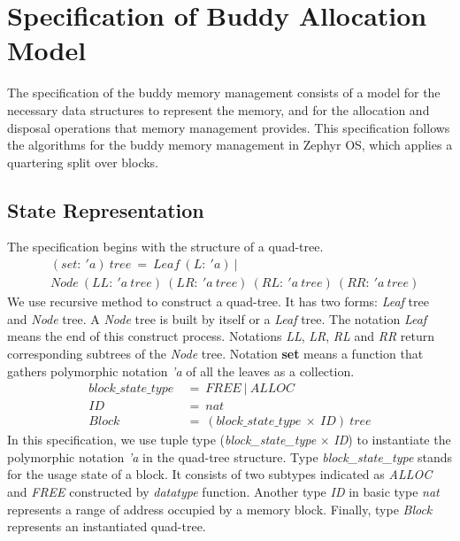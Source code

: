 \section{Specification of Buddy Allocation Model}
The specification of the buddy memory management consists of a model for the necessary data structures to represent the memory, and for the allocation and disposal operations that memory management provides. This specification follows the algorithms for the buddy memory management in Zephyr OS, which applies a quartering split over blocks.

\subsection{State Representation}
\label{statedes}
The specification begins with the structure of a quad-tree.
{\footnotesize
\begin{align*}
&(set:\ 'a)\ tree\ =\ Leaf\ (L:\ 'a)\ | \\
&Node\ (LL:\ 'a\ tree)\ (LR:\ 'a\ tree)\ (RL:\ 'a\ tree)\ (RR:\ 'a\ tree)
\end{align*}
}
We use recursive method to construct a quad-tree. It has two forms: \emph{Leaf} tree and \emph{Node} tree. A \emph{Node} tree is built by itself or a \emph{Leaf} tree. The notation \emph{Leaf} means the end of this construct process. Notations \emph{LL}, \emph{LR}, \emph{RL} and \emph{RR} return corresponding subtrees of the \emph{Node} tree. Notation \textbf{set} means a function that gathers polymorphic notation \emph{'a} of all the leaves as a collection.
{\footnotesize
\begin{align*}
block\_state\_type\ &=\ FREE\ |\ ALLOC \\
ID\ &=\ nat \\
Block\ &=\ (block\_state\_type\ \times\ ID)\ tree
\end{align*}
}
In this specification, we use tuple type (\emph{block\_state\_type} $\times$ \emph{ID}) to instantiate the polymorphic notation \emph{'a} in the quad-tree structure. Type \emph{block\_state\_type} stands for the usage state of a block. It consists of two subtypes indicated as \emph{ALLOC} and \emph{FREE} constructed by \emph{datatype} function. Another type \emph{ID} in basic type \emph{nat} represents a range of address occupied by a memory block. Finally, type \emph{Block} represents an instantiated quad-tree.

